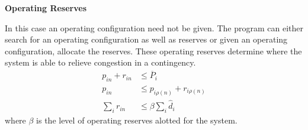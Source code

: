 \textbf{Operating Reserves}

In this case an operating configuration need not be given.  The program can either search for an operating configuration as well as reserves or given an operating configuration, allocate the reserves.  These operating reserves determine where the system is able to relieve congestion in a contingency.
\begin{align}
p_{in} + r_{in} &\le \overline{P}_i \\
p_{in} &\le p_{i\rho (n)} + r_{i\rho (n)} \\
\sum_i r_{in} &\le \beta \sum_i \hat{d}_i 
\end{align}
where $\beta$ is the level of operating reserves alotted for the system.
